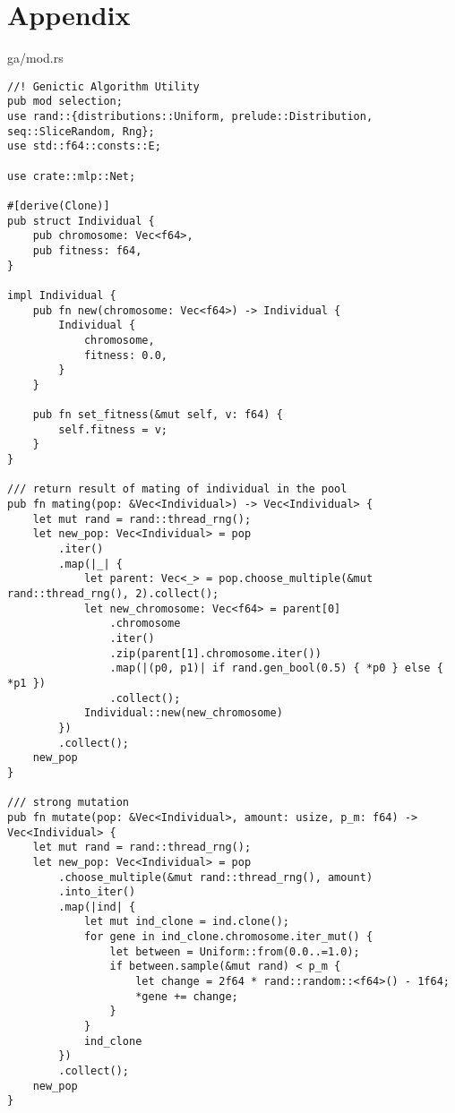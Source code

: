 \renewcommand{\listingscaption}{Source Code}
\newenvironment{code}{\captionsetup{type=listing}}{}
\section*{Appendix}

\begin{code}
\caption{ga/mod.rs}
\label{src:ga}
\begin{verbatim}  
//! Genictic Algorithm Utility
pub mod selection;
use rand::{distributions::Uniform, prelude::Distribution, seq::SliceRandom, Rng};
use std::f64::consts::E;

use crate::mlp::Net;

#[derive(Clone)]
pub struct Individual {
    pub chromosome: Vec<f64>,
    pub fitness: f64,
}

impl Individual {
    pub fn new(chromosome: Vec<f64>) -> Individual {
        Individual {
            chromosome,
            fitness: 0.0,
        }
    }

    pub fn set_fitness(&mut self, v: f64) {
        self.fitness = v;
    }
}

/// return result of mating of individual in the pool
pub fn mating(pop: &Vec<Individual>) -> Vec<Individual> {
    let mut rand = rand::thread_rng();
    let new_pop: Vec<Individual> = pop
        .iter()
        .map(|_| {
            let parent: Vec<_> = pop.choose_multiple(&mut rand::thread_rng(), 2).collect();
            let new_chromosome: Vec<f64> = parent[0]
                .chromosome
                .iter()
                .zip(parent[1].chromosome.iter())
                .map(|(p0, p1)| if rand.gen_bool(0.5) { *p0 } else { *p1 })
                .collect();
            Individual::new(new_chromosome)
        })
        .collect();
    new_pop
}

/// strong mutation
pub fn mutate(pop: &Vec<Individual>, amount: usize, p_m: f64) -> Vec<Individual> {
    let mut rand = rand::thread_rng();
    let new_pop: Vec<Individual> = pop
        .choose_multiple(&mut rand::thread_rng(), amount)
        .into_iter()
        .map(|ind| {
            let mut ind_clone = ind.clone();
            for gene in ind_clone.chromosome.iter_mut() {
                let between = Uniform::from(0.0..=1.0);
                if between.sample(&mut rand) < p_m {
                    let change = 2f64 * rand::random::<f64>() - 1f64;
                    *gene += change;
                }
            }
            ind_clone
        })
        .collect();
    new_pop
}


\end{verbatim}
\end{code}
